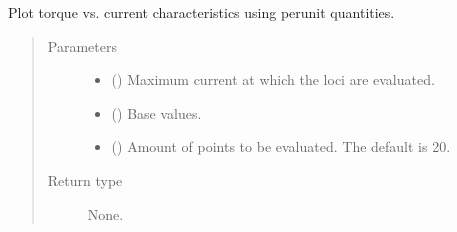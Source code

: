 \documentclass[letterpaper,10pt,english]{sphinxmanual}
\begin{document}
\begin{fulllineitems}
\begin{fulllineitems}
\label{\detokenize{control.sm:control.sm.torque.TorqueCharacteristics.plot_torque_current}}
\pysigstartsignatures
{}
\pysigstopsignatures
\sphinxAtStartPar
Plot torque vs. current characteristics using per\sphinxhyphen{}unit quantities.
\begin{quote}\begin{description}
\item[{Parameters}] \leavevmode\begin{itemize}
\item {} 
\sphinxAtStartPar
{} () \textendash{} Maximum current at which the loci are evaluated.

\item {} 
\sphinxAtStartPar
{} () \textendash{} Base values.

\item {} 
\sphinxAtStartPar
{} (\sphinxstyleliteralemphasis{\sphinxupquote{, }}) \textendash{} Amount of points to be evaluated. The default is 20.

\end{itemize}

\item[{Return type}] \leavevmode
\sphinxAtStartPar
None.

\end{description}\end{quote}

\end{fulllineitems}



\end{fulllineitems}
\end{document}
